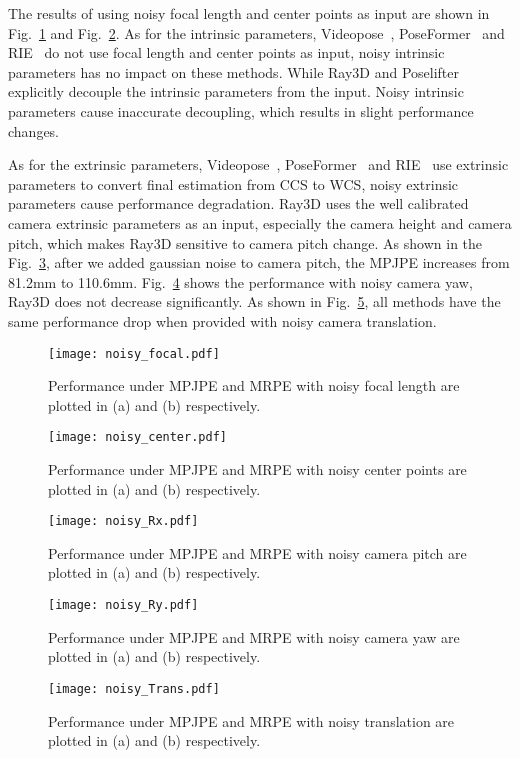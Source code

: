 \documentclass[10pt,twocolumn,letterpaper]{article}
\begin{document}
The results of using noisy focal length and center points as input are shown in Fig.~\ref{fig:noisy_focal_length} and Fig.~\ref{fig:noisy_center}. As for the intrinsic parameters, Videopose~\cite{dario2019videopose}, PoseFormer~\cite{ce2021poseformer} and RIE~\cite{wenkang2021improving} do not use focal length and center points as input, noisy intrinsic parameters has no impact on these methods. While Ray3D and Poselifter~\cite{ju2019absposelifter} explicitly decouple the intrinsic parameters from the input. Noisy intrinsic parameters cause inaccurate decoupling, which results in slight performance changes. 

As for the extrinsic parameters, Videopose~\cite{dario2019videopose}, PoseFormer~\cite{ce2021poseformer} and RIE~\cite{wenkang2021improving} use extrinsic parameters to convert final estimation from CCS to WCS, noisy extrinsic parameters cause performance degradation. Ray3D uses the well calibrated camera extrinsic parameters as an input, especially the camera height and camera pitch, which makes Ray3D sensitive to camera pitch change. As shown in the Fig.~\ref{fig:noisy_Rx}, after we added gaussian noise to camera pitch, the MPJPE increases from 81.2mm to 110.6mm. Fig.~\ref{fig:noisy_Ry} shows the performance with noisy camera yaw, Ray3D does not decrease significantly. As shown in Fig.~\ref{fig:noisy_Trans}, all methods have the same performance drop when provided with noisy camera translation.

\begin{figure}
  \centering
  \texttt{[image: noisy\_focal.pdf]}
  \caption{Performance under MPJPE and MRPE with noisy focal length are plotted in (a) and (b) respectively.}
  \label{fig:noisy_focal_length}
\end{figure}

\begin{figure}
  \centering
  \texttt{[image: noisy\_center.pdf]}
  \caption{Performance under MPJPE and MRPE with noisy center points are plotted in (a) and (b) respectively.}
  \label{fig:noisy_center}
\end{figure}

\begin{figure}
  \centering
  \texttt{[image: noisy\_Rx.pdf]}
  \caption{Performance under MPJPE and MRPE with noisy camera pitch are plotted in (a) and (b) respectively.}
  \label{fig:noisy_Rx}
\end{figure}

\begin{figure}
  \centering
  \texttt{[image: noisy\_Ry.pdf]}
  \caption{Performance under MPJPE and MRPE with noisy camera yaw are plotted in (a) and (b) respectively.}
  \label{fig:noisy_Ry}
\end{figure}
\begin{figure}
  \centering
  \texttt{[image: noisy\_Trans.pdf]}
  \caption{Performance under MPJPE and MRPE with noisy translation are plotted in (a) and (b) respectively. }
  \label{fig:noisy_Trans}
\end{figure}
\end{document}

